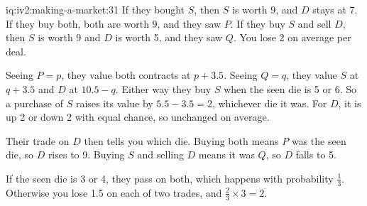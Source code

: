 \begin{solution}{iq:iv2:making-a-market:31}
If they bought $S$, then $S$ is worth 9, and $D$ stays at 7. If they buy both, both are worth 9, and they saw $P$. If they buy $S$ and sell $D$, then $S$ is worth 9 and $D$ is worth 5, and they saw $Q$. You lose 2 on average per deal.

Seeing $P = p$, they value both contracts at $p + 3.5$. Seeing $Q = q$, they value $S$ at $q + 3.5$ and $D$ at $10.5 - q$. Either way they buy $S$ when the seen die is 5 or 6. So a purchase of $S$ raises its value by $5.5 - 3.5 = 2$, whichever die it was. For $D$, it is up 2 or down 2 with equal chance, so unchanged on average.

Their trade on $D$ then tells you which die. Buying both means $P$ was the seen die, so $D$ rises to 9. Buying $S$ and selling $D$ means it was $Q$, so $D$ falls to 5.

If the seen die is 3 or 4, they pass on both, which happens with probability $\tfrac13$. Otherwise you lose 1.5 on each of two trades, and $\tfrac23 \times 3 = 2$.

\end{solution}

